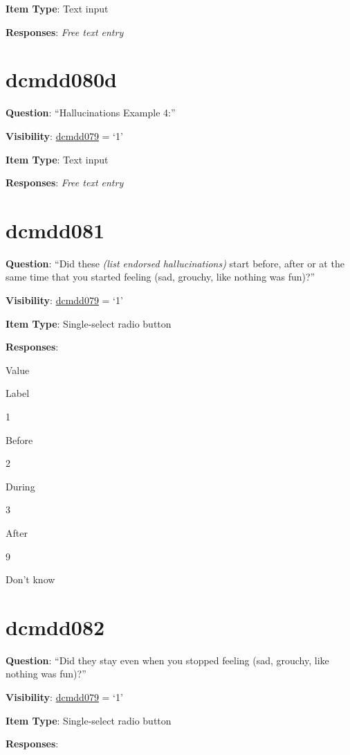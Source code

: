 \documentclass[]{book}
\begin{document}
\textbf{Item Type}: Text input

\textbf{Responses}: \emph{Free text entry}

\hypertarget{dcmdd080d}{%
\section{dcmdd080d}\label{dcmdd080d}}

\textbf{Question}: ``Hallucinations Example 4:''

\textbf{Visibility}: \protect\hyperlink{dcmdd079}{dcmdd079} = `1'

\textbf{Item Type}: Text input

\textbf{Responses}: \emph{Free text entry}

\hypertarget{dcmdd081}{%
\section{dcmdd081}\label{dcmdd081}}

\textbf{Question}: ``Did these \emph{(list endorsed hallucinations)} start before, after or at the same time that you started feeling (sad, grouchy, like nothing was fun)?''

\textbf{Visibility}: \protect\hyperlink{dcmdd079}{dcmdd079} = `1'

\textbf{Item Type}: Single-select radio button

\textbf{Responses}:

Value

Label

1

Before

2

During

3

After

9

Don't know

\hypertarget{dcmdd082}{%
\section{dcmdd082}\label{dcmdd082}}

\textbf{Question}: ``Did they stay even when you stopped feeling (sad, grouchy, like nothing was fun)?''

\textbf{Visibility}: \protect\hyperlink{dcmdd079}{dcmdd079} = `1'

\textbf{Item Type}: Single-select radio button

\textbf{Responses}:
\end{document}

